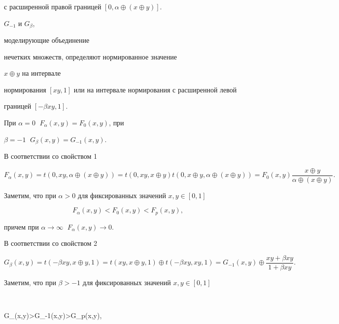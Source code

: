 с расширенной правой границей $[0,\alpha\oplus(x\oplus y)]$.


\;$G_{-1}$ и $G_\beta$,


моделирующие объединение


нечетких множеств, определяют нормированное значение


$x\oplus y$ на интервале


нормирования $[xy,1]$ или на интервале нормирования с расширенной левой


границей $[-\beta xy,1]$.





При $\alpha=0\;$ $F_\alpha(x,y)=F_0(x,y)$, при


$\beta=-1\;$ $G_\beta(x,y)=G_{-1}(x,y)$.





В соответствии со свойством 1


$$


F_\alpha(x,y)=t(0,xy,\alpha\oplus(x\oplus y))=


t(0,xy,x\oplus y)t(0,x\oplus y,\alpha\oplus(x\oplus y))=


F_0(x,y)\frac{x\oplus y}{\alpha\oplus(x\oplus y)}.


$$





Заметим, что при $\alpha>0$ для фиксированных значений $x,y\in[0,1]$


$$


F_\alpha(x,y)<F_0(x,y)<F_p(x,y),


$$


причем при $\alpha\to\infty\;$ $F_\alpha(x,y)\to 0$.





В соответствии со свойством 2


$$


G_\beta(x,y)=t(-\beta xy,x\oplus y,1)=t(xy,x\oplus y,1)\oplus


t(-\beta xy,xy,1)=G_{-1}(x,y)\oplus


\frac{xy+\beta xy}{1+\beta xy}.


$$





Заметим, что при $\beta>-1$ для фиксированных значений $x,y\in[0,1]$


$$


G_\beta(x,y)>G_{-1}(x,y)>G_p(x,y),


